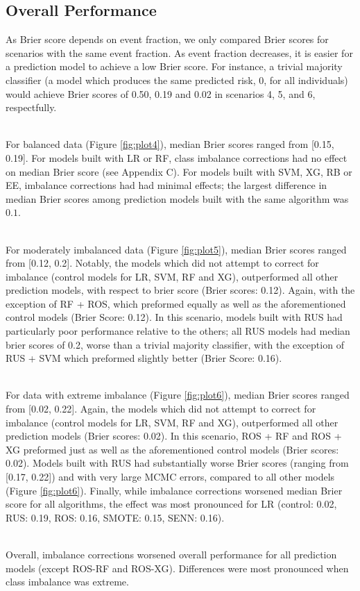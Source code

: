 \documentclass[AMA,STIX1COL,]{WileyNJD-v2}
\begin{document}
\hypertarget{overall-performance}{%
\subsection{Overall Performance}\label{overall-performance}}

\hfill\break
As Brier score depends on event fraction, we only compared Brier scores
for scenarios with the same event fraction. As event fraction decreases,
it is easier for a prediction model to achieve a low Brier score. For
instance, a trivial majority classifier (a model which produces the same
predicted risk, 0, for all individuals) would achieve Brier scores of
0.50, 0.19 and 0.02 in scenarios 4, 5, and 6, respectfully.\\
\strut \\
For balanced data (Figure \ref{fig:plot4}), median Brier scores ranged
from {[}0.15, 0.19{]}. For models built with LR or RF, class imbalance
corrections had no effect on median Brier score (see Appendix C). For
models built with SVM, XG, RB or EE, imbalance corrections had had
minimal effects; the largest difference in median Brier scores among
prediction models built with the same algorithm was \(0.1\).\\
\strut \\
For moderately imbalanced data (Figure \ref{fig:plot5}), median Brier
scores ranged from {[}0.12, 0.2{]}. Notably, the models which did not
attempt to correct for imbalance (control models for LR, SVM, RF and
XG), outperformed all other prediction models, with respect to brier
score (Brier scores: 0.12). Again, with the exception of RF + ROS, which
preformed equally as well as the aforementioned control models (Brier
Score: 0.12). In this scenario, models built with RUS had particularly
poor performance relative to the others; all RUS models had median brier
scores of 0.2, worse than a trivial majority classifier, with the
exception of RUS + SVM which preformed slightly better (Brier Score:
0.16).\\
\strut \\
For data with extreme imbalance (Figure \ref{fig:plot6}), median Brier
scores ranged from {[}0.02, 0.22{]}. Again, the models which did not
attempt to correct for imbalance (control models for LR, SVM, RF and
XG), outperformed all other prediction models (Brier scores: 0.02). In
this scenario, ROS + RF and ROS + XG preformed just as well as the
aforementioned control models (Brier scores: 0.02). Models built with
RUS had substantially worse Brier scores (ranging from {[}0.17, 0.22{]})
and with very large MCMC errors, compared to all other models (Figure
\ref{fig:plot6}). Finally, while imbalance corrections worsened median
Brier score for all algorithms, the effect was most pronounced for LR
(control: 0.02, RUS: 0.19, ROS: 0.16, SMOTE: 0.15, SENN: 0.16).\\
\strut \\
Overall, imbalance corrections worsened overall performance for all
prediction models (except ROS-RF and ROS-XG). Differences were most
pronounced when class imbalance was extreme.
\end{document}
